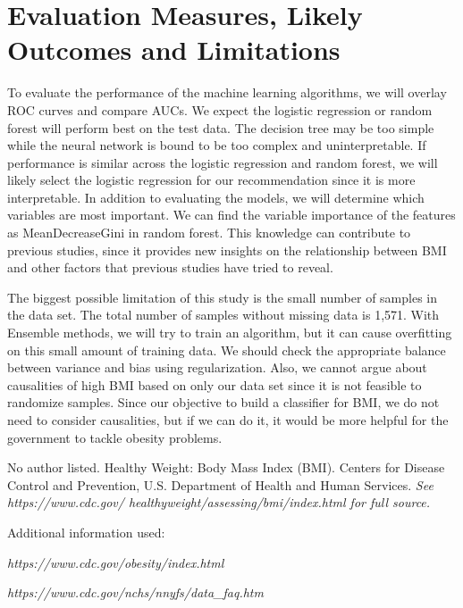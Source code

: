 \documentclass[twoside,11pt]{article}
\begin{document}
\section{Evaluation Measures, Likely Outcomes and Limitations}
To evaluate the performance of the machine learning algorithms, we will overlay ROC curves and compare AUCs. We expect the logistic regression or random forest will perform best on the test data. The decision tree may be too simple while the neural network is bound to be too complex and uninterpretable. If performance is similar across the logistic regression and random forest, we will likely select the logistic regression for our recommendation since it is more interpretable. In addition to evaluating the models, we will determine which variables are most important. We can find the variable importance of the features as MeanDecreaseGini in random forest. This knowledge can contribute to previous studies, since it provides new insights on the relationship between BMI and other factors that previous studies have tried to reveal.

The biggest possible limitation of this study is the small number of samples in the data set. The total number of samples without missing data is 1,571. With Ensemble methods, we will try to train an algorithm, but it can cause overfitting on this small amount of training data. We should check the appropriate balance between variance and bias using regularization. Also, we cannot argue about causalities of high BMI based on only our data set since it is not feasible to randomize samples. Since our objective to build a classifier for BMI, we do not need to consider causalities, but if we can do it, it would be more helpful for the government to tackle obesity problems.


\vspace{5mm} %
No author listed. Healthy Weight: Body Mass Index (BMI). Centers for Disease Control and Prevention, U.S. Department of Health and Human Services.
 {\noindent \em See https://www.cdc.gov/
 healthyweight/assessing/bmi/index.html for full source.}
 
 \vspace{5mm}
 
Additional information used:

{\noindent \em https://www.cdc.gov/obesity/index.html}

{\noindent \em https://www.cdc.gov/nchs/nnyfs/data_faq.htm}
\end{document}
